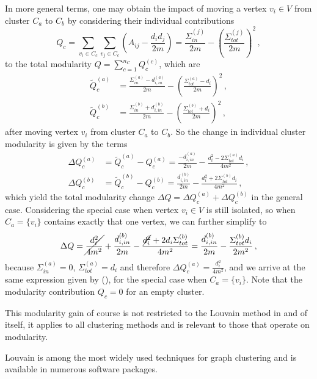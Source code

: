 \documentclass[12pt, a4paper]{article}
\begin{document}
  In more general terms, one may obtain the impact of moving a vertex $v_i \in V$ from cluster $C_a$ to $C_b$ by considering their individual contributions
  $$Q_c = \sum_{v_i \in C_c} \sum_{v_j \in C_c} \left(A_{ij} - \frac{d_i d_j}{2m}\right) = \frac{\Sigma_{in}^{(j)}}{2m} - \left(\frac{\Sigma_{tot}^{(j)}}{2m}\right)^2\,,$$
  to the total modularity $Q = \sum_{c=1}^{n_C} Q_c^{(c)}$, which are
  \begin{align*}
    \tilde{Q}_c^{(a)} & = \frac{\Sigma_{in}^{(a)} - d_{i, in}^{(a)}}{2m} - \left(\frac{\Sigma_{tot}^{(a)} - d_i}{2m}\right)^2\,, \\
    \tilde{Q}_c^{(b)} & = \frac{\Sigma_{in}^{(b)} + d_{i, in}^{(b)}}{2m} - \left(\frac{\Sigma_{tot}^{(b)} + d_i}{2m}\right)^2\,,
  \end{align*}
  after moving vertex $v_i$ from cluster $C_a$ to $C_b$.
  So the change in individual cluster modularity is given by the terms
  \begin{align*}
    \Delta Q_c^{(a)} & = \tilde{Q}_c^{(a)} - Q_c^{(a)} = \frac{-d_{i, in}^{(a)}}{2m} - \frac{d_i^2 - 2 \Sigma_{tot}^{(a)} d_i}{4m^2}\,, \\
    \Delta Q_c^{(b)} & = \tilde{Q}_c^{(b)} - Q_c^{(b)} = \frac{d_{i, in}^{(b)}}{2m} - \frac{d_i^2 + 2 \Sigma_{tot}^{(b)} d_i}{4m^2}\,,
  \end{align*}
  which yield the total modularity change $\Delta Q = \Delta Q_c^{(a)} + \Delta Q_c^{(b)}$ in the general case.
  Considering the special case when vertex $v_i \in V$ is still isolated, so when $C_a = \{v_i\}$ contains exactly that one vertex, we can further simplify to
  $$\Delta Q = \cancel{\frac{d_i^2}{4m^2}} + \frac{d_{i,in}^{(b)}}{2m} - \frac{\cancel{d_i^2} + 2 d_i \Sigma_{tot}^{(b)}}{4m^2} = \frac{d_{i,in}^{(b)}}{2m} - \frac{\Sigma_{tot}^{(b)} d_i}{2m^2} \,,$$
  because $\Sigma_{in}^{(a)} = 0$, $\Sigma_{tot}^{(a)} = d_i$ and therefore $\Delta Q_c^{(a)} = \frac{d_i^2}{4m^2}$, and we arrive at the same expression given by \cite{lambiotte-louvain-clustering} (), for the special case when $C_a = \{v_i\}$.
  Note that the modularity contribution $Q_c = 0$ for an empty cluster.

  This modularity gain of course is not restricted to the Louvain method in and of itself, it applies to all clustering methods and is relevant to those that operate on modularity.

  Louvain is among the most widely used techniques for graph clustering and is available in numerous software packages.
\end{document}
